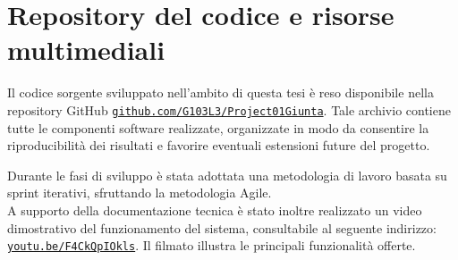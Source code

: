 \chapter{Repository del codice e risorse multimediali}
\label{appendice:repository}

Il codice sorgente sviluppato nell'ambito di questa tesi è reso disponibile nella repository GitHub \href{https://github.com/G103L3/Project01Giunta}{\texttt{github.com/G103L3/Project01Giunta}}. Tale archivio contiene tutte le componenti software realizzate, organizzate in modo da consentire la riproducibilità dei risultati e favorire eventuali estensioni future del progetto.

Durante le fasi di sviluppo è stata adottata una metodologia di lavoro basata su sprint iterativi, sfruttando la metodologia Agile.\\

A supporto della documentazione tecnica è stato inoltre realizzato un video dimostrativo del funzionamento del sistema, consultabile al seguente indirizzo: \href{https://www.youtube.com/watch?v=F4CkQpIOkls}{\texttt{youtu.be/F4CkQpIOkls}}. Il filmato illustra le principali funzionalità offerte.